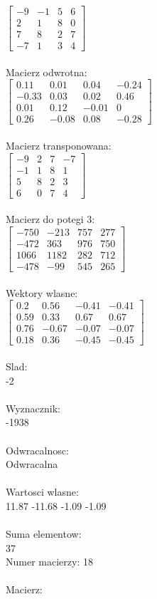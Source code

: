 \documentclass[a4paper,12pt]{article}
\begin{document}
$\begin{bmatrix} -9&-1&5&6\\2&1&8&0\\7&8&2&7\\-7&1&3&4 \end{bmatrix}$
\\
\\
Macierz odwrotna:\\

$\begin{bmatrix} 0.11&0.01&0.04&-0.24\\-0.33&0.03&0.02&0.46\\0.01&0.12&-0.01&0\\0.26&-0.08&0.08&-0.28 \end{bmatrix}$
\\
\\
Macierz transponowana:\\

$\begin{bmatrix} -9&2&7&-7\\-1&1&8&1\\5&8&2&3\\6&0&7&4 \end{bmatrix}$
\\
\\
Macierz do potegi 3:\\

$\begin{bmatrix} -750&-213&757&277\\-472&363&976&750\\1066&1182&282&712\\-478&-99&545&265 \end{bmatrix}$
\\
\\
Wektory wlasne:\\

$\begin{bmatrix} 0.2&0.56&-0.41&-0.41\\0.59&0.33&0.67&0.67\\0.76&-0.67&-0.07&-0.07\\0.18&0.36&-0.45&-0.45 \end{bmatrix}$
\\
\\
Slad:\\
-2
\\
\\
Wyznacznik:\\
-1938
\\
\\
Odwracalnosc:\\
Odwracalna
\\
\\
Wartosci wlasne:\\
11.87 -11.68 -1.09 -1.09
\\
\\
Suma elementow:\\
37
\\
\newpage
Numer macierzy:
18
\\
\\
Macierz:\\
\end{document}
